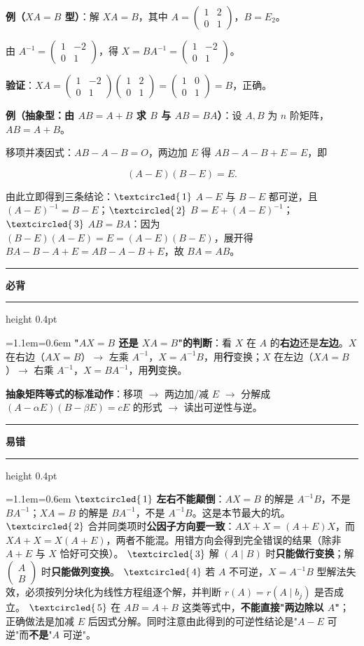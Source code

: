\documentclass[11pt,openany,UTF8]{ctexbook}
\newcommand{\circled}[1]{\textcircled{\scriptsize\,#1}}
\newcommand{\callouthead}[2]{%
  \par\addvspace{7pt}\noindent
  {\color{#1}\rule[-0.15em]{3pt}{1.05em}}\hspace{0.5em}%
  {\bfseries\color{#1}#2}\par\nobreak\vspace{-0.35em}%
  {\color{rulesep}\hrule height 0.4pt}\nobreak\vspace{0.45em}%
  \begingroup\small\setlength{\parindent}{0pt}%
  \leftskip=1.1em\rightskip=0.6em\noindent\ignorespaces}
\newcommand{\calloutend}{\par\endgroup\addvspace{7pt}}
\newenvironment{callkey}[1]{\callouthead{keybar}{#1}}{\calloutend}
\newenvironment{callwarn}[1]{\callouthead{warnbar}{#1}}{\calloutend}
\begin{document}
\textbf{例（$XA=B$ 型）}：解 $XA=B$，其中 $A=\begin{pmatrix}1&2\\0&1\end{pmatrix}$，$B=E_2$。

由 $A^{-1}=\begin{pmatrix}1&-2\\0&1\end{pmatrix}$，得 $X=BA^{-1}=\begin{pmatrix}1&-2\\0&1\end{pmatrix}$。

\textbf{验证}：$XA=\begin{pmatrix}1&-2\\0&1\end{pmatrix}\begin{pmatrix}1&2\\0&1\end{pmatrix}=\begin{pmatrix}1&0\\0&1\end{pmatrix}=B$，正确。

\textbf{例（抽象型：由 $AB=A+B$ 求 $B$ 与 $AB=BA$）}：设 $A,B$ 为 $n$ 阶矩阵，$AB=A+B$。

移项并凑因式：$AB-A-B=O$，两边加 $E$ 得 $AB-A-B+E=E$，即

\[(A-E)(B-E)=E .\]

由此立即得到三条结论：$\circled{1}$ $A-E$ 与 $B-E$ 都可逆，且 $(A-E)^{-1}=B-E$；$\circled{2}$ $B=E+(A-E)^{-1}$；$\circled{3}$ \textbf{$AB=BA$}：因为 $(B-E)(A-E)=E=(A-E)(B-E)$，展开得 $BA-B-A+E=AB-A-B+E$，故 $BA=AB$。

\begin{callkey}{必背}
\textbf{"$AX=B$ 还是 $XA=B$"的判断}：看 $X$ 在 $A$ 的\textbf{右边}还是\textbf{左边}。$X$ 在右边（$AX=B$）$\to$ 左乘 $A^{-1}$，$X=A^{-1}B$，用\textbf{行}变换；$X$ 在左边（$XA=B$）$\to$ 右乘 $A^{-1}$，$X=BA^{-1}$，用\textbf{列}变换。

\textbf{抽象矩阵等式的标准动作}：移项 $\to$ 两边加/减 $E$ $\to$ 分解成 $(A-\alpha E)(B-\beta E)=cE$ 的形式 $\to$ 读出可逆性与逆。

\end{callkey}

\begin{callwarn}{易错}
$\circled{1}$ \textbf{左右不能颠倒}：$AX=B$ 的解是 $A^{-1}B$，不是 $BA^{-1}$；$XA=B$ 的解是 $BA^{-1}$，不是 $A^{-1}B$。这是本节最大的坑。 $\circled{2}$ 合并同类项时\textbf{公因子方向要一致}：$AX+X=(A+E)X$，而 $XA+X=X(A+E)$，两者不能混。用错方向会得到完全错误的结果（除非 $A+E$ 与 $X$ 恰好可交换）。 $\circled{3}$ 解 $(A\mid B)$ 时\textbf{只能做行变换}；解 $\begin{pmatrix}A\\B\end{pmatrix}$ 时\textbf{只能做列变换}。 $\circled{4}$ 若 $A$ 不可逆，$X=A^{-1}B$ 型解法失效，必须按列分块化为线性方程组逐个解，并判断 $r(A)=r(A\mid b_j)$ 是否成立。 $\circled{5}$ 在 $AB=A+B$ 这类等式中，\textbf{不能直接"两边除以 $A$"}；正确做法是加减 $E$ 后因式分解。同时注意由此得到的可逆性结论是"$A-E$ 可逆"而\textbf{不是}"$A$ 可逆"。

\end{callwarn}
\end{document}
